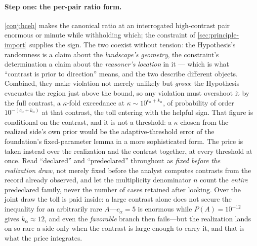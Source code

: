 \documentclass[11pt]{article}
\theoremstyle{definition}
\begin{document}
\paragraph{Step one: the per-pair ratio form.} \autoref{conj:hceh} makes the canonical ratio at an interrogated high-contrast pair enormous or minute while withholding which; the constraint of \autoref{sec:principle-import} supplies the sign. The two coexist without tension: the Hypothesis's randomness is a claim about the \emph{landscape's geometry}, the constraint's determination a claim about the \emph{reasoner's location} in it --- which is what ``contrast is prior to direction'' means, and the two describe different objects. Combined, they make violation not merely unlikely but \emph{gross}: the Hypothesis evacuates the region just above the bound, so any violation must overshoot it by the full contrast, a $\kappa$-fold exceedance at $\kappa \sim 10^{c_\alpha + k_\alpha}$, of probability of order $10^{-(c_\alpha + k_\alpha)}$ at that contrast, the toll entering with the helpful sign. That figure is conditional on the contrast, and it is not a threshold: a $\kappa$ chosen from the realized side's own prior would be the adaptive-threshold error of the foundation's fixed-parameter lemma in a more sophisticated form. The price is taken instead over the realization and the contrast together, at every threshold at once. Read ``declared'' and ``predeclared'' throughout as \emph{fixed before the realization draw}, not merely fixed before the analyst computes contrasts from the record already observed, and let the multiplicity denominator $n$ count the \emph{entire} predeclared family, never the number of cases retained after looking. Over the joint draw the toll is paid inside: a large contrast alone does not secure the inequality for an arbitrarily rare $A$---$c_\alpha = 5$ is enormous while $P(A) = 10^{-12}$ gives $k_\alpha \approx 12$, and even the \emph{favorable} branch then fails---but the realization lands on so rare a side only when the contrast is large enough to carry it, and that is what the price integrates.
\end{document}
